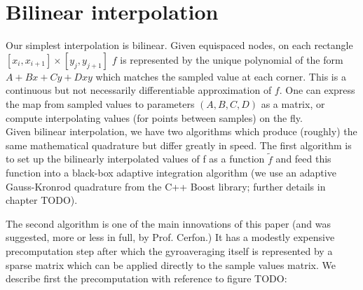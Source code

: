 \section{Bilinear interpolation}
Our simplest interpolation is bilinear.  Given equispaced nodes, on each rectangle $[x_i,x_{i+1}] \times [y_j, y_{j+1}]$ $f$ is represented by the unique polynomial of the form $A + Bx + Cy + Dxy$ which matches the sampled value at each corner.  This is a continuous but not necessarily differentiable approximation of $f$.  One can express the map from sampled values to parameters $(A,B,C,D)$ as a matrix, or compute interpolating values (for points between samples) on the fly.  \\

Given bilinear interpolation, we have two algorithms which produce (roughly) the same mathematical quadrature but differ greatly in speed.  The first algorithm is to set up the bilinearly interpolated values of f as a function $\tilde{f}$ and feed this function into a black-box adaptive integration algorithm (we use an adaptive Gauss-Kronrod quadrature from the C++ Boost library; further details in chapter TODO).

The second algorithm is one of the main innovations of this paper (and was suggested, more or less in full, by Prof. Cerfon.)  It has a modestly expensive precomputation step after which the gyroaveraging itself is represented by a sparse matrix which can be applied directly to the sample values matrix.  We describe first the precomputation with reference to figure TODO:

